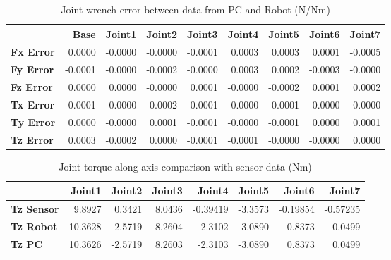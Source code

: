 \begin{table}[h!]
	\centering
	\caption{Joint wrench error between data from PC and Robot (N/Nm)}
	\label{wrech_Error_Pose4}
	\begin{tabular}{|l|r|r|r|r|r|r|r|r|}
		\hline
		\textbf{}  & \textbf{Base} & \textbf{Joint1}  & \textbf{Joint2}  & \textbf{Joint3}  & \textbf{Joint4}  & \textbf{Joint5}  & \textbf{Joint6}  & \textbf{Joint7} \\ \hline
		\textbf{Fx Error}  & 0.0000        & -0.0000        & -0.0000        & -0.0001        & 0.0003        & 0.0003        & 0.0001        & -0.0005 \\ \hline
		\textbf{Fy Error}  & -0.0001        & -0.0000        & -0.0002        & -0.0000        & 0.0003        & 0.0002        & -0.0003        & -0.0000 \\ \hline
		\textbf{Fz Error}  & 0.0000        & 0.0000        & -0.0000        & 0.0001        & -0.0000        & -0.0002        & 0.0001        & 0.0002 \\ \hline
		\textbf{Tx Error}  & 0.0001        & -0.0000        & -0.0002        & -0.0001        & -0.0000        & 0.0001        & -0.0000        & -0.0000 \\ \hline
		\textbf{Ty Error}  & 0.0000        & -0.0000        & 0.0001        & -0.0001        & -0.0000        & -0.0001        & 0.0000        & 0.0001 \\ \hline
		\textbf{Tz Error}  & 0.0003        & -0.0002        & 0.0000        & -0.0001        & -0.0001        & -0.0000        & -0.0000        & 0.0000 \\ \hline
	\end{tabular}
\end{table}

\begin{table}[h!]
	\centering
	\caption{Joint torque along axis comparison with sensor data (Nm)}
	\label{wrech_Sensor_Pose4}
	\begin{tabular}{|l|r|r|r|r|r|r|r|}
		\hline
		\textbf{} & \textbf{Joint1} & \textbf{Joint2} & \textbf{Joint3} & \textbf{Joint4} & \textbf{Joint5} & \textbf{Joint6} & \textbf{Joint7} \\ \hline
		\textbf{Tz Sensor}  & 9.8927           & 0.3421           & 8.0436            & -0.39419           & -3.3573           & -0.19854           & -0.57235           \\ \hline
		\textbf{Tz Robot}  	& 10.3628           & -2.5719           & 8.2604            & -2.3102           & -3.0890           & 0.8373           & 0.0499           \\ \hline
		\textbf{Tz PC}  	& 10.3626           & -2.5719           & 8.2603            & -2.3103           & -3.0890           & 0.8373           & 0.0499           \\ \hline
	\end{tabular}
\end{table}

